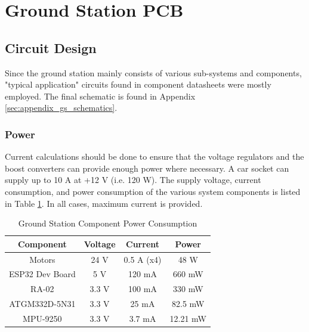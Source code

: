 \graphicspath{{./figures}}

\section{Ground Station PCB}
\subsection{Circuit Design}
Since the ground station mainly consists of various sub-systems and components, "typical application" circuits found in component datasheets were mostly employed. The final schematic is found in Appendix \ref{sec:appendix_gs_schematics}.

\subsubsection{Power}
Current calculations should be done to ensure that the voltage regulators and the boost converters can provide enough power where necessary. A car socket can supply up to 10 A at +12 V (i.e. 120 W). The supply voltage, current consumption, and power consumption of the various system components is listed in Table \ref{tab:gs_component_consumption}. In all cases, maximum current is provided.

\begin{table}[!htb]
  \centering
  \renewcommand{\arraystretch}{1.2}
  \begin{tabular}{ |c|c|c|c| }
  \hline
  \textbf{Component}        & \textbf{Voltage}    & \textbf{Current}     & \textbf{Power}   \\
  \hline
  Motors                    & 24 V                & 0.5 A (x4)           & 48 W             \\ \hline
  ESP32 Dev Board           & 5 V                 & 120 mA               & 660 mW           \\ \hline
  RA-02                     & 3.3 V               & 100 mA               & 330 mW           \\ \hline
  ATGM332D-5N31             & 3.3 V               & 25 mA                & 82.5 mW          \\ \hline
  MPU-9250                  & 3.3 V               & 3.7 mA               & 12.21 mW         \\ \hline
  \end{tabular}
  \caption{Ground Station Component Power Consumption}
  \label{tab:gs_component_consumption}
\end{table}

